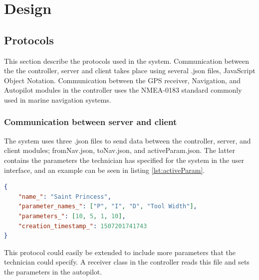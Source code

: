 \chapter{Design}

\section{Protocols}

This section describe the protocols used in the system. Communication between the the controller, server and client takes place using several .json files, JavaScript Object Notation. Communication between the GPS receiver, Navigation, and Autopilot modules in the controller uses the NMEA-0183 standard commonly used in marine navigation systems\cite{NMEA_wiki}. 

\subsection{Communication between server and client}

The system uses three .json files to send data between the controller, server, and client modules; fromNav.json, toNav.json, and activeParam.json. The latter contains the parameters the technician has specified for the system in the user interface, and an example can be seen in listing \ref{lst:activeParam}.

\begin{lstlisting}[caption = {Example of activeParam.JSON}, captionpos=b, label={lst:activeParam}, language=json,firstnumber=1]
{
	"name_": "Saint Princess",
	"parameter_names_": ["P", "I", "D", "Tool Width"],
	"parameters_": [10, 5, 1, 10],
	"creation_timestamp_": 1507201741743
}
\end{lstlisting}

This protocol could easily be extended to include more parameters that the technician could specify. A receiver class in the controller reads this file and sets the parameters in the autopilot.

